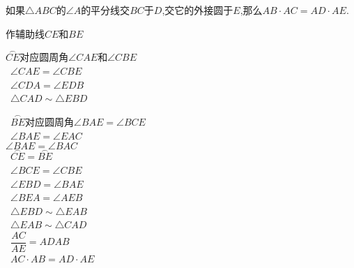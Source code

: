 \begin{questions}
	\question 如果$\triangle{ABC}$的$\angle{A}$的平分线交$BC$于$D$,交它的外接圆于$E$,那么$AB\cdot AC = AD \cdot AE$.
	\begin{figure*}[htbp]
		\centering
	\end{figure*}
	\begin{solution}
		\begin{mathenum}
			\item 作辅助线$CE$和$BE$
			\item \because $\overset{\frown}{CE}$对应圆周角$\angle{CAE}$和$\angle{CBE}$
			\\ \therefore\ $\angle{CAE} = \angle{CBE}$
			\\ \because\ $\angle{CDA} = \angle{EDB} $
			\\ \therefore\ $\triangle{CAD} \sim \triangle{EBD}$
			\item \because\ $\overset{\frown}{BE}$对应圆周角$\angle{BAE} = \angle{BCE}$
			\\ \therefore\ $\angle{BAE} = \angle{EAC}$
			\\ \because $\angle{BAE} = \angle{BAC}$
			\\ \therefore\ $\overset{\frown}{CE} = \overset{\frown}{BE}$
			\\ \therefore\ $\angle{BCE} = \angle{CBE}$
			\\ \therefore\ $\angle{EBD} = \angle{BAE}$
			\\ \because\ $\angle{BEA} = \angle{AEB}$
			\\ \therefore\ $\triangle{EBD} \sim \triangle{EAB}$
			\\ \therefore\ $\triangle{EAB} \sim \triangle{CAD}$
			\\ \therefore\ $\dfrac{AC}{AE}={AD}{AB}$
			\\ \therefore\ $AC\cdot AB = AD\cdot AE$
		\end{mathenum}


\end{solution}
\end{questions}
